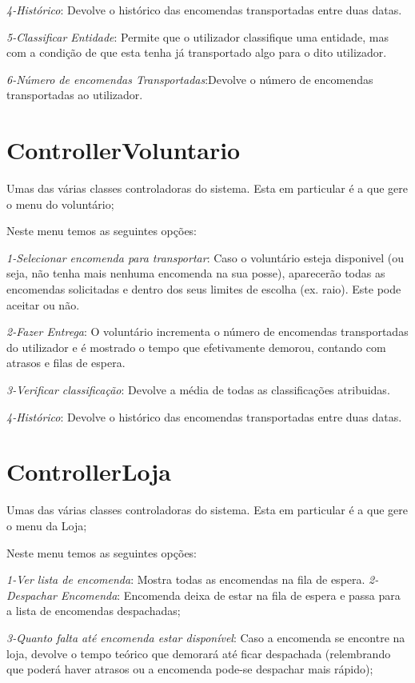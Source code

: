 \documentclass[a4paper]{report}
\begin{document}
      \textit{4-Histórico}: Devolve o histórico das encomendas transportadas entre duas datas.
      
      \textit{5-Classificar Entidade}: Permite que o utilizador classifique uma entidade, mas com a condição de que esta tenha já transportado algo para o dito utilizador. 
      
      \textit{6-Número de encomendas Transportadas}:Devolve o número de encomendas transportadas ao utilizador.
    
	\section{ControllerVoluntario}
	   Umas das várias classes controladoras do sistema. Esta em particular é a que gere o menu do voluntário;
	   
	   Neste menu temos as seguintes opções:
	   
	   \textit{1-Selecionar encomenda para transportar}: Caso o voluntário esteja disponivel (ou seja, não tenha mais nenhuma encomenda na sua posse), aparecerão todas as encomendas solicitadas e dentro dos seus limites de escolha (ex. raio). Este pode aceitar ou não.
	   
	   \textit{2-Fazer Entrega}: O voluntário incrementa o número de encomendas transportadas do utilizador e é mostrado o tempo que efetivamente demorou, contando com atrasos e filas de espera.
	   
	   \textit{3-Verificar classificação}: Devolve a média de todas as classificações atribuidas.
	   
	   \textit{4-Histórico}: Devolve o histórico das encomendas transportadas entre duas datas.
	   

	\section{ControllerLoja}
	 Umas das várias classes controladoras do sistema. Esta em particular é a que gere o menu da Loja;
	 
	 Neste menu temos as seguintes opções:
	 
	 \textit{1-Ver lista de encomenda}: Mostra todas as encomendas na fila de espera.
	 \textit{2-Despachar Encomenda}: Encomenda deixa de estar na fila de espera e passa para a lista de encomendas despachadas;
	 
	 \textit{3-Quanto falta até encomenda estar disponível}: Caso a encomenda se encontre na loja, devolve o tempo teórico que demorará até ficar despachada (relembrando que poderá haver atrasos ou a encomenda pode-se despachar mais rápido);
	
\end{document}
